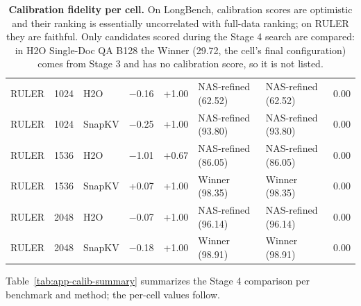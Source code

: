 \begin{table}[t]
\begin{tabular}{@{}l r l r r l l r@{}}
    RULER & 1024 & H2O & $-$0.16 & +1.00 & NAS-refined (62.52) & NAS-refined (62.52) & 0.00 \\
    RULER & 1024 & SnapKV & $-$0.25 & +1.00 & NAS-refined (93.80) & NAS-refined (93.80) & 0.00 \\
    RULER & 1536 & H2O & $-$1.01 & +0.67 & NAS-refined (86.05) & NAS-refined (86.05) & 0.00 \\
    RULER & 1536 & SnapKV & +0.07 & +1.00 & Winner (98.35) & Winner (98.35) & 0.00 \\
    RULER & 2048 & H2O & $-$0.07 & +1.00 & NAS-refined (96.14) & NAS-refined (96.14) & 0.00 \\
    RULER & 2048 & SnapKV & $-$0.18 & +1.00 & Winner (98.91) & Winner (98.91) & 0.00 \\
    \bottomrule
  \end{tabular}
  \caption{\textbf{Calibration fidelity per cell.} On LongBench, calibration scores are optimistic and their ranking is essentially uncorrelated with full-data ranking; on RULER they are faithful. Only candidates scored during the Stage 4 search are compared: in H2O Single-Doc QA B128 the Winner (29.72, the cell's final configuration) comes from Stage 3 and has no calibration score, so it is not listed.}
  \label{tab:app-calib}
\end{table}


Table~\ref{tab:app-calib-summary} summarizes the Stage 4 comparison per benchmark and method; the per-cell values follow.

\begin{table}[!htbp]
  \centering
  \footnotesize\setlength{\tabcolsep}{2.5pt}
  
  \caption{\textbf{Stage 4 calibration (10\% subset) vs.\ full-data scores, summary.} Cells: (task, budget) pairs. Gap: mean calibration minus full-data score. $\tau$: mean Kendall correlation between the two rankings of each cell's re-evaluated configurations. Picks: cells where the calibration-best candidate is also full-data best. Regret: mean full-data points lost by trusting calibration.}
  \label{tab:app-calib-summary}
\end{table}

